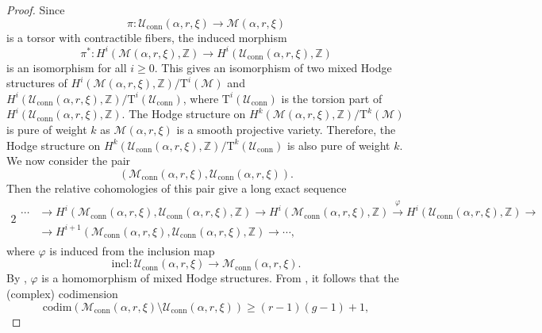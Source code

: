 \documentclass[11pt, reqno]{amsart}
\numberwithin{equation}{section}
\theoremstyle{definition}
\begin{document}
\begin{proof}
    Since $$\pi : \mathcal{U}_{\mathrm{conn}}(\alpha, r, \xi) \longrightarrow \mathcal{M}(\alpha, r, \xi)$$ is a torsor with contractible fibers, the induced morphism
    \begin{equation}\label{isom}
        \pi^* : H^i(\mathcal{M}(\alpha, r, \xi), \mathbb{Z}) \longrightarrow H^i(\mathcal{U}_{\mathrm{conn}}(\alpha, r, \xi), \mathbb{Z})
    \end{equation}
    is an isomorphism for all $i \geq 0$. This gives an isomorphism of two mixed Hodge structures of $H^i(\mathcal{M}(\alpha, r, \xi), \mathbb{Z})/\mathrm{T}^i(\mathcal{M})$ and $H^i(\mathcal{U}_{\mathrm{conn}}(\alpha, r, \xi), \mathbb{Z})/\mathrm{T}^i(\mathcal{U}_{\mathrm{conn}})$, where $\mathrm{T}^i(\mathcal{U}_{\mathrm{conn}})$ is the torsion part of $H^i(\mathcal{U}_{\mathrm{conn}}(\alpha, r, \xi), \mathbb{Z})$. The Hodge structure on $H^k(\mathcal{M}(\alpha, r, \xi), \mathbb{Z})/\mathrm{T}^k(\mathcal{M})$ is pure of weight $k$ as $\mathcal{M}(\alpha, r, \xi)$ is a smooth projective variety. Therefore, the Hodge structure on $H^k(\mathcal{U}_{\mathrm{conn}}(\alpha, r, \xi), \mathbb{Z})/\mathrm{T}^k(\mathcal{U}_{\mathrm{conn}})$ is also pure of weight $k$. We now consider the pair $$(\mathcal{M}_{\mathrm{conn}}(\alpha, r, \xi), \mathcal{U}_{\mathrm{conn}}(\alpha, r, \xi)).$$ Then the relative cohomologies of this pair give a long exact sequence
    \begin{alignat}{2}\label{les}
    \begin{split}
    \cdots &\rightarrow H^i(\mathcal{M}_{\mathrm{conn}}(\alpha, r, \xi), \mathcal{U}_{\mathrm{conn}}(\alpha, r, \xi), \mathbb{Z}) \rightarrow H^i(\mathcal{M}_{\mathrm{conn}}(\alpha, r, \xi), \mathbb{Z}) \xrightarrow{\varphi} H^i(\mathcal{U}_{\mathrm{conn}}(\alpha, r, \xi), \mathbb{Z}) \rightarrow \\ &\rightarrow H^{i+1}(\mathcal{M}_{\mathrm{conn}}(\alpha, r, \xi), \mathcal{U}_{\mathrm{conn}}(\alpha, r, \xi), \mathbb{Z}) \rightarrow \cdots, 
    \end{split}
    \end{alignat}
where $\varphi$ is induced from the inclusion map
\[
\mathrm{incl} :  \mathcal{U}_{\mathrm{conn}}(\alpha, r, \xi) \longrightarrow \mathcal{M}_{\mathrm{conn}}(\alpha, r, \xi).
\]
By \cite[p. $43$]{D75}, $\varphi$ is a homomorphism of mixed Hodge structures. From , it follows that the (complex) codimension 
\[
\mathrm{codim}(\mathcal{M}_{\mathrm{conn}}(\alpha, r, \xi) \setminus \mathcal{U}_{\mathrm{conn}}(\alpha, r, \xi)) \geq (r-1)(g-1) +1,
\]
\end{proof}
\end{document}
